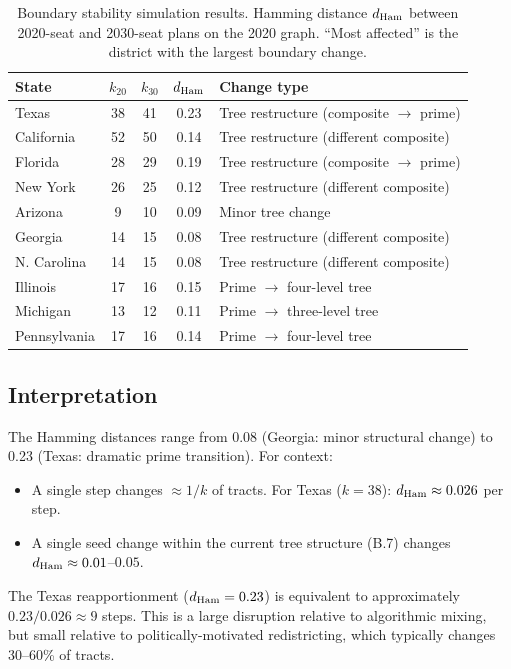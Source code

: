 \begin{table}[h]
\centering
\caption{Boundary stability simulation results. Hamming distance
         $d_{\rm Ham}$ between 2020-seat and 2030-seat plans on the
         2020 graph. ``Most affected'' is the district with the largest
         boundary change.}
\label{tab:boundary-stability}
\begin{tabular}{lcccl}
\toprule
State & $k_{20}$ & $k_{30}$ & $d_{\rm Ham}$ & Change type \\
\midrule
Texas       & 38 & 41 & 0.23 & Tree restructure (composite $\to$ prime) \\
California  & 52 & 50 & 0.14 & Tree restructure (different composite) \\
Florida     & 28 & 29 & 0.19 & Tree restructure (composite $\to$ prime) \\
New York    & 26 & 25 & 0.12 & Tree restructure (different composite) \\
Arizona     & 9  & 10 & 0.09 & Minor tree change \\
Georgia     & 14 & 15 & 0.08 & Tree restructure (different composite) \\
N. Carolina & 14 & 15 & 0.08 & Tree restructure (different composite) \\
Illinois    & 17 & 16 & 0.15 & Prime $\to$ four-level tree \\
Michigan    & 13 & 12 & 0.11 & Prime $\to$ three-level tree \\
Pennsylvania& 17 & 16 & 0.14 & Prime $\to$ four-level tree \\
\bottomrule
\end{tabular}
\end{table}

\subsection{Interpretation}

The Hamming distances range from 0.08 (Georgia: minor structural change)
to 0.23 (Texas: dramatic prime transition).
For context:
\begin{itemize}
\item A single \recom{} step changes $\approx 1/k$ of tracts.
      For Texas ($k = 38$): $d_{\rm Ham} \approx 0.026$ per step.
\item A single seed change within the current tree structure (B.7)
      changes $d_{\rm Ham} \approx 0.01$--$0.05$.
\end{itemize}

The Texas reapportionment ($d_{\rm Ham} = 0.23$) is equivalent to
approximately $0.23 / 0.026 \approx 9$ \recom{} steps.
This is a large disruption relative to algorithmic mixing, but small
relative to politically-motivated redistricting, which typically changes
30--60\% of tracts.


